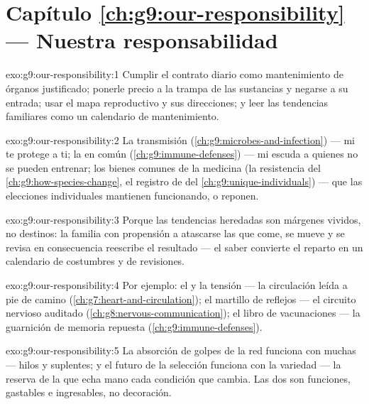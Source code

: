 \section*{Capítulo \ref{ch:g9:our-responsibility} --- Nuestra responsabilidad}

\begin{solution}{exo:g9:our-responsibility:1}
Cumplir el contrato diario como mantenimiento de órganos justificado;
ponerle precio a la trampa de las sustancias y negarse a su entrada;
usar el mapa reproductivo y sus direcciones; y leer las tendencias
familiares como un calendario de mantenimiento.
\end{solution}

\begin{solution}{exo:g9:our-responsibility:2}
La transmisión (\cref{ch:g9:microbes-and-infection}) --- mi  te
protege a ti; la  en común
(\cref{ch:g9:immune-defenses}) --- mi  escuda a quienes no se
pueden entrenar; los bienes comunes de la medicina (la resistencia del
\cref{ch:g9:how-species-change}, el registro de  del
\cref{ch:g9:unique-individuals}) --- que las elecciones individuales
mantienen funcionando, o reponen.
\end{solution}

\begin{solution}{exo:g9:our-responsibility:3}
Porque las tendencias heredadas son márgenes vividos, no destinos: la
familia con propensión a atascarse las  que come, se mueve y se
revisa en consecuencia reescribe el resultado --- el saber convierte el
reparto en un calendario de costumbres y de revisiones.
\end{solution}

\begin{solution}{exo:g9:our-responsibility:4}
Por ejemplo: el  y la tensión --- la circulación leída a pie de
camino (\cref{ch:g7:heart-and-circulation}); el martillo de reflejos
--- el circuito nervioso auditado
(\cref{ch:g8:nervous-communication}); el libro de vacunaciones --- la
guarnición de memoria repuesta
(\cref{ch:g9:immune-defenses}).
\end{solution}

\begin{solution}{exo:g9:our-responsibility:5}
La absorción de golpes de la red funciona con muchas  ---
hilos y suplentes; y el futuro de la selección funciona con la variedad
--- la reserva de la que echa mano cada condición que cambia. Las dos
son funciones, gastables e ingresables, no decoración.
\end{solution}

